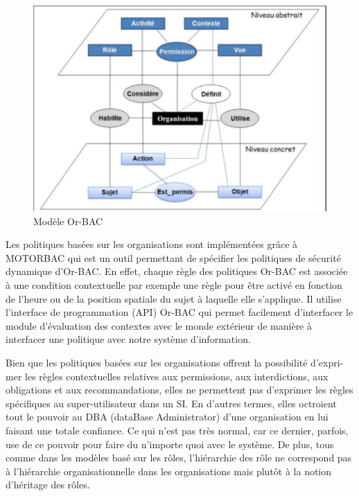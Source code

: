 \begin{figure}[h!]
    \centering
		\includegraphics[scale=0.7]{chap2/images/or-bac.png}
    \caption{Modèle Or-BAC \cite{theseBenoit}}
	 \label{figOrbac}
\end{figure}
\hspace*{0.5cm} Les politiques basées sur les organisations sont implémentées grâce à MOTORBAC qui est un outil  permettant de spécifier les politiques de sécurité dynamique d'Or-BAC. En effet, chaque règle des politiques Or-BAC est associée à une condition contextuelle par exemple une règle pour être activé en fonction de l'heure ou de la position spatiale du sujet à laquelle elle s'applique. Il utilise l'interface de programmation (API) Or-BAC qui permet facilement d'interfacer le module d'évaluation des contextes avec le monde extérieur de manière à interfacer une politique avec notre système d'information.

\label{sectionLimiteOr-bac}

Bien que les politiques basées sur les organisations offrent la possibilité d'expri-mer les règles contextuelles relatives aux permissions, aux interdictions, aux obligations et aux recommandations, elles ne permettent pas d'exprimer les règles spécifiques au super-utilisateur dans un SI. En d'autres termes, elles octroient tout le pouvoir au DBA (dataBase Administrator) d'une organisation en lui faisant une totale confiance. Ce qui n'est pas très normal, car ce dernier, parfois, use de ce pouvoir pour faire du n'importe quoi avec le système. De plus, tous comme dans les modèles basé sur les rôles, l'hiérarchie des rôle ne correspond pas à l'hiérarchie organisationnelle dans les organisations mais plutôt à la notion d'héritage des rôles.

